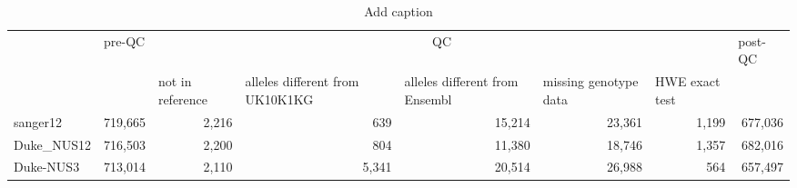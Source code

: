 \begin{table}[htbp]
  \centering
  \caption{Add caption}
    \begin{tabular}{lrrrrrrr}
          & \multicolumn{1}{l}{pre-QC} & \multicolumn{5}{c}{QC}                & \multicolumn{1}{l}{post-QC} \\
          &       & \multicolumn{1}{l}{not in reference} & \multicolumn{1}{l}{alleles different from UK10K1KG} & \multicolumn{1}{l}{alleles different from Ensembl} & \multicolumn{1}{l}{missing genotype data} & \multicolumn{1}{l}{HWE exact test} &  \\
    sanger12 & 719,665 & 2,216 & 639   & 15,214 & 23,361 & 1,199 & 677,036 \\
    Duke\_NUS12 & 716,503 & 2,200 & 804   & 11,380 & 18,746 & 1,357 & 682,016 \\
    Duke-NUS3 & 713,014 & 2,110 & 5,341 & 20,514 & 26,988 & 564   & 657,497 \\
    \end{tabular}%
  \label{tab:addlabel}%
\end{table}%
